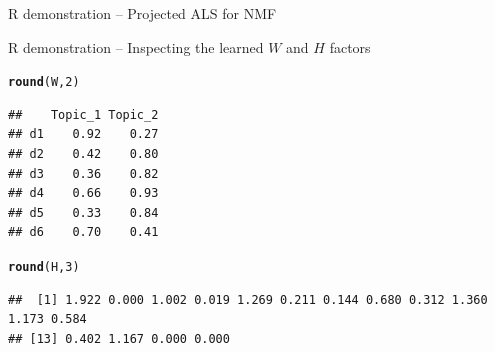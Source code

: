 \documentclass[aspectratio=169]{beamer}\usepackage[]{graphicx}\usepackage[]{xcolor}
\makeatletter
\newcommand{\hlnum}[1]{\textcolor[rgb]{0.686,0.059,0.569}{#1}}%
\newcommand{\hldef}[1]{\textcolor[rgb]{0.345,0.345,0.345}{#1}}%
\newcommand{\hlkwd}[1]{\textcolor[rgb]{0.737,0.353,0.396}{\textbf{#1}}}%
\newenvironment{kframe}{%
 \def\at@end@of@kframe{}%
 \ifinner\ifhmode%
  \def\at@end@of@kframe{\end{minipage}}%
  \begin{minipage}{\columnwidth}%
 \fi\fi%
 \def\FrameCommand##1{\hskip\@totalleftmargin \hskip-\fboxsep
 \colorbox{shadecolor}{##1}\hskip-\fboxsep
     \hskip-\linewidth \hskip-\@totalleftmargin \hskip\columnwidth}%
 \MakeFramed {\advance\hsize-\width
   \@totalleftmargin\z@ \linewidth\hsize
   \@setminipage}}%
 {\par\unskip\endMakeFramed%
 \at@end@of@kframe}
\newenvironment{knitrout}{}{} %
\makeatother
\begin{document}
\begin{frame}[fragile]{R demonstration -- Projected ALS for NMF}
\begin{knitrout}
\begin{kframe}
{\ttfamily\noindent\bfseries\color{errorcolor}{\#\# Error in `rownames<-`:\\\#\# ! attempt to set 'rownames' on an object with no dimensions}}\end{kframe}
\end{knitrout}
\end{frame}


\begin{frame}[fragile]{R demonstration -- Inspecting the learned $W$ and $H$ factors}
\begin{knitrout}
\color{fgcolor}\begin{kframe}
\begin{alltt}
\hlkwd{round}\hldef{(W,} \hlnum{2}\hldef{)}
\end{alltt}
\begin{verbatim}
##    Topic_1 Topic_2
## d1    0.92    0.27
## d2    0.42    0.80
## d3    0.36    0.82
## d4    0.66    0.93
## d5    0.33    0.84
## d6    0.70    0.41
\end{verbatim}
\begin{alltt}
\hlkwd{round}\hldef{(H,} \hlnum{3}\hldef{)}
\end{alltt}
\begin{verbatim}
##  [1] 1.922 0.000 1.002 0.019 1.269 0.211 0.144 0.680 0.312 1.360 1.173 0.584
## [13] 0.402 1.167 0.000 0.000
\end{verbatim}
\end{kframe}
\end{knitrout}
\end{frame}


\begin{knitrout}
\color{fgcolor}\begin{kframe}


{\ttfamily\noindent\bfseries\color{errorcolor}{\#\# Error in `H[, 8:1]`:\\\#\# ! incorrect number of dimensions}}\end{kframe}
\end{knitrout}

\end{document}
